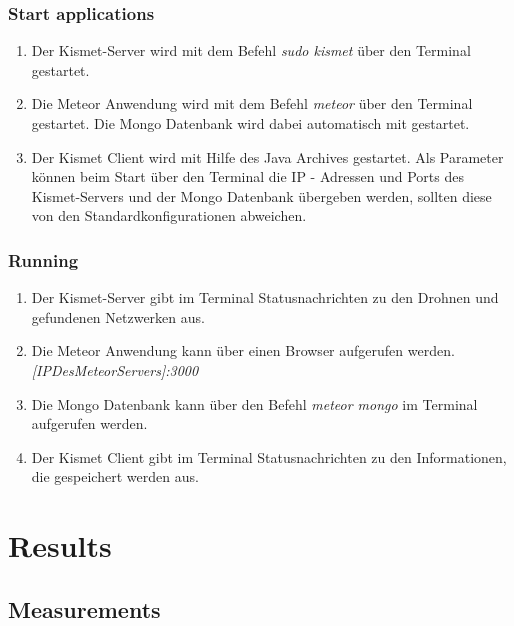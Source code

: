 \documentclass[a4paper]{spie}  %
\begin{document}
\subsubsection{Start applications}
\begin{enumerate}
 \item Der Kismet-Server wird mit dem Befehl \emph{sudo kismet} über den Terminal gestartet.
 \item Die Meteor Anwendung wird mit dem Befehl \emph{meteor} über den Terminal gestartet. Die Mongo Datenbank wird dabei automatisch mit gestartet.
 \item Der Kismet Client wird mit Hilfe des Java Archives gestartet. Als Parameter können beim Start über den Terminal die IP - Adressen und Ports des Kismet-Servers und der Mongo Datenbank übergeben werden, sollten diese von den Standardkonfigurationen abweichen.
\end{enumerate}
\subsubsection{Running}
\begin{enumerate}
 \item Der Kismet-Server gibt im Terminal Statusnachrichten zu den Drohnen und gefundenen Netzwerken aus.
 \item Die Meteor Anwendung kann über einen Browser aufgerufen werden. \emph{[IPDesMeteorServers]:3000}
 \item Die Mongo Datenbank kann über den Befehl \emph{meteor mongo} im Terminal aufgerufen werden.
 \item Der Kismet Client gibt im Terminal Statusnachrichten zu den Informationen, die gespeichert werden aus.
\end{enumerate}

\section{Results}\label{result}
\subsection{Measurements}
\end{document}
